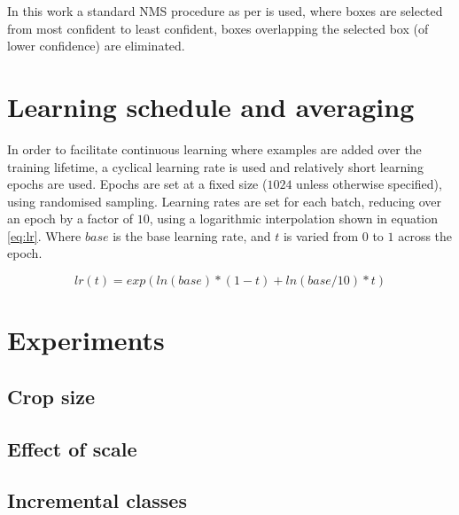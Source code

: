 In this work a standard \gls{NMS} procedure as per \cite{Wang2017} is used, where boxes are selected from most confident to least confident, boxes overlapping the selected box (of lower confidence) are eliminated.


\section {Learning schedule and averaging}
\label{sec:schedule}

In order to facilitate continuous learning where examples are added over the training lifetime, a cyclical learning rate is used and relatively short learning epochs are used. Epochs are set at a fixed size ($1024$ unless otherwise specified), using randomised sampling. Learning rates are set for each batch, reducing over an epoch by a factor of $10$, using a logarithmic interpolation shown in equation \ref{eq:lr}. Where $base$ is the base learning rate, and $t$ is varied from $0$ to $1$ across the epoch.

\begin{equation}
lr(t) = exp(ln (base) * (1 - t) + ln(base/10)  * t)
\label{eq:lr}
\end{equation}




\section {Experiments}
\label{sec:experiments}

\subsection {Crop size}
\label{sec:crop_size}


\subsection {Effect of scale}
\label{sec:detection_architecture}



\subsection {Incremental classes}
\label{sec:incremental}


